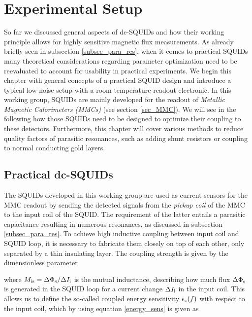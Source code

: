 \chapter{Experimental Setup}

So far we discussed general aspects of dc-SQUIDs and how their working principle allows for highly sensitive magnetic flux measurements. As already briefly seen in subsection \ref{subsec_para_res}, when it comes to practical SQUIDs many theoretical considerations regarding parameter optimization need to be reevaluated to account for usability in practical experiments. We begin this chapter with general concepts of a practical SQUID design and introduce a typical low-noise setup with a room temperature readout electronic. In this working group, SQUIDs are mainly developed for the readout of \textit{Metallic Magnetic Calorimeters (MMCs)} (see section \ref{sec_MMC}). We will see in the following how those SQUIDs need to be designed to optimize their coupling to these detectors. Furthermore, this chapter will cover various methods to reduce quality factors of parasitic resonances, such as adding shunt resistors or coupling to normal conducting gold layers.

\section{Practical dc-SQUIDs}\label{sec_practical_SQUID}

The SQUIDs developed in this working group are used as current sensors for the MMC readout by sending the detected signals from the \textit{pickup coil} of the MMC to the input coil of the SQUID. The requirement of the latter entails a parasitic capacitance resulting in numerous resonances, as discussed in subsection \ref{subsec_para_res}. To achieve high inductive coupling between input coil and SQUID loop, it is necessary to fabricate them closely on top of each other, only separated by a thin insulating layer. The coupling strength is given by the dimensionless parameter 


where $M_{\rm is}=\Delta\Phi_{\rm s}/\Delta I_{\rm i}$ is the mutual inductance, describing how much flux $\Delta\Phi_{\rm s}$ is generated in the SQUID loop for a current change $\Delta I_{\rm i}$ in the input coil. This allows us to define the so-called coupled energy sensitivity $\epsilon_{\rm c}(f)$ with respect to the input coil, which by using equation \ref{energy_sens} is given as

